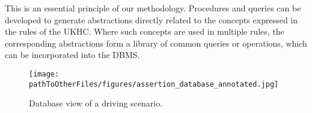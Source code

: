 This is an essential principle of our methodology. Procedures and queries can be developed to generate abstractions directly related to the concepts expressed in the rules of the UKHC. 
Where such concepts are used in multiple rules, the corresponding abstractions form a library of common queries or operations, which can be incorporated into the DBMS. %
%
%
%        
%

\begin{figure}
    \centering
    \texttt{[image: \\pathToOtherFiles/figures/assertion\_database\_annotated.jpg]}
    \caption{Database view of a driving scenario.}
    \label{fig:assertion_database_annotated}
\end{figure}

